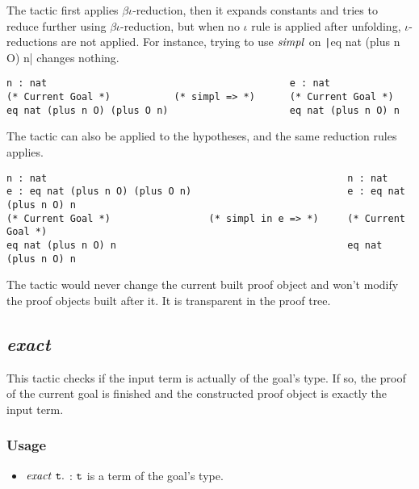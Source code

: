 The tactic first applies $\beta\iota$-reduction, then it expands constants and tries to reduce 
further using $\beta\iota$-reduction, but when no $\iota$ rule is applied after unfolding,
$\iota$-reductions are not applied. For instance, trying to use $\it simpl$ on 
\texttt|eq nat (plus n O) n| changes nothing.
\begin{center}
\begin{minipage}{0.8\textwidth}
\begin{verbatim}
n : nat                                          e : nat
(* Current Goal *)           (* simpl => *)      (* Current Goal *)
eq nat (plus n O) (plus O n)                     eq nat (plus n O) n
\end{verbatim}
\end{minipage}
\end{center}

The tactic can also be applied to the hypotheses, and the same reduction rules applies.
\begin{center}
\begin{verbatim}
n : nat                                                    n : nat                
e : eq nat (plus n O) (plus O n)                           e : eq nat (plus n O) n
(* Current Goal *)                 (* simpl in e => *)     (* Current Goal *)      
eq nat (plus n O) n                                        eq nat (plus n O) n         
\end{verbatim} 
\end{center}

The tactic would never change the current built proof object and won't modify the proof objects built after it.
It is transparent in the proof tree.

\subsection{\it exact}

This tactic checks if the input term is actually of the goal's type. If so, the proof of the current goal is finished and the 
constructed proof object is exactly the input term.

\subsubsection*{Usage}
\begin{itemize}
\item ${\it exact}\ \tt t.$ : $\tt t$ is a term of the goal's type. 
\end{itemize}

